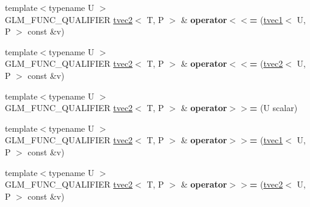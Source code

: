 \begin{DoxyCompactItemize}
\item 
\hypertarget{structglm_1_1tvec2_a4ee968bac5e887631cb05668dd34da58}{{\footnotesize template$<$typename U $>$ }\\G\-L\-M\-\_\-\-F\-U\-N\-C\-\_\-\-Q\-U\-A\-L\-I\-F\-I\-E\-R \hyperlink{structglm_1_1tvec2}{tvec2}$<$ T, P $>$ \& {\bfseries operator$<$$<$=} (\hyperlink{structglm_1_1tvec1}{tvec1}$<$ U, P $>$ const \&v)}\label{structglm_1_1tvec2_a4ee968bac5e887631cb05668dd34da58}

\item 
\hypertarget{structglm_1_1tvec2_adc5cbebcee78fbff8fee4978e4dd8c87}{{\footnotesize template$<$typename U $>$ }\\G\-L\-M\-\_\-\-F\-U\-N\-C\-\_\-\-Q\-U\-A\-L\-I\-F\-I\-E\-R \hyperlink{structglm_1_1tvec2}{tvec2}$<$ T, P $>$ \& {\bfseries operator$<$$<$=} (\hyperlink{structglm_1_1tvec2}{tvec2}$<$ U, P $>$ const \&v)}\label{structglm_1_1tvec2_adc5cbebcee78fbff8fee4978e4dd8c87}

\item 
\hypertarget{structglm_1_1tvec2_ab3fb4bc1c2f4341932885837bb7e48d9}{{\footnotesize template$<$typename U $>$ }\\G\-L\-M\-\_\-\-F\-U\-N\-C\-\_\-\-Q\-U\-A\-L\-I\-F\-I\-E\-R \hyperlink{structglm_1_1tvec2}{tvec2}$<$ T, P $>$ \& {\bfseries operator$>$$>$=} (U scalar)}\label{structglm_1_1tvec2_ab3fb4bc1c2f4341932885837bb7e48d9}

\item 
\hypertarget{structglm_1_1tvec2_a7c5bc1c8d4d3f176b17cbc50ed99d953}{{\footnotesize template$<$typename U $>$ }\\G\-L\-M\-\_\-\-F\-U\-N\-C\-\_\-\-Q\-U\-A\-L\-I\-F\-I\-E\-R \hyperlink{structglm_1_1tvec2}{tvec2}$<$ T, P $>$ \& {\bfseries operator$>$$>$=} (\hyperlink{structglm_1_1tvec1}{tvec1}$<$ U, P $>$ const \&v)}\label{structglm_1_1tvec2_a7c5bc1c8d4d3f176b17cbc50ed99d953}

\item 
\hypertarget{structglm_1_1tvec2_a6c2dc839f420cba67d7c0dfaab196081}{{\footnotesize template$<$typename U $>$ }\\G\-L\-M\-\_\-\-F\-U\-N\-C\-\_\-\-Q\-U\-A\-L\-I\-F\-I\-E\-R \hyperlink{structglm_1_1tvec2}{tvec2}$<$ T, P $>$ \& {\bfseries operator$>$$>$=} (\hyperlink{structglm_1_1tvec2}{tvec2}$<$ U, P $>$ const \&v)}\label{structglm_1_1tvec2_a6c2dc839f420cba67d7c0dfaab196081}

\end{DoxyCompactItemize}
